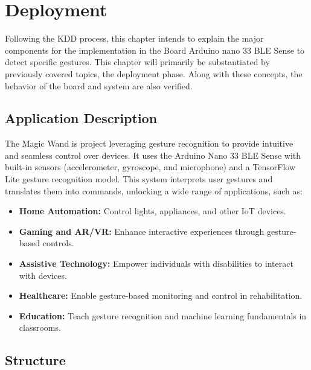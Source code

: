 %


\chapter{Deployment}
\label{chapter 9}

Following the KDD process, this chapter intends to explain the major components for the implementation in the Board Arduino nano 33 BLE Sense to detect specific gestures. This chapter will primarily be substantiated by previously covered topics, the deployment phase. Along with these concepts, the behavior of the board and system are also verified. 

\section{Application Description}

The Magic Wand is project leveraging gesture recognition to provide intuitive and seamless control over devices. It uses the Arduino Nano 33 BLE Sense with built-in sensors (accelerometer, gyroscope, and microphone) and a TensorFlow Lite gesture recognition model.\cite{Daity:21} This system interprets user gestures and translates them into commands, unlocking a wide range of applications, such as:

\begin{itemize}
	\item \textbf{Home Automation:} Control lights, appliances, and other IoT devices.
	\item \textbf{Gaming and AR/VR:} Enhance interactive experiences through gesture-based controls.
	\item \textbf{Assistive Technology:} Empower individuals with disabilities to interact with devices.
	\item \textbf{Healthcare:} Enable gesture-based monitoring and control in rehabilitation.
	\item \textbf{Education:} Teach gesture recognition and machine learning fundamentals in classrooms.\cite{Daity:21}
\end{itemize}

\section{Structure}

